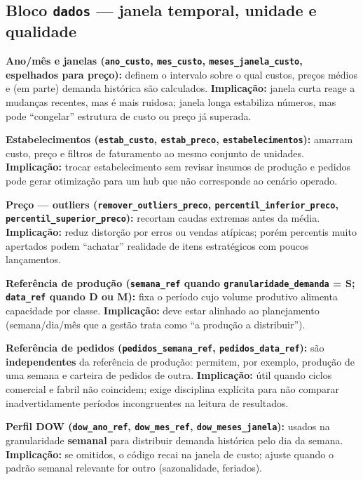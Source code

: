 \documentclass[11pt,a4paper]{article}
\begin{document}
\subsection{Bloco \texttt{dados} --- janela temporal, unidade e qualidade}

\textbf{Ano/mês e janelas (\texttt{ano\_custo}, \texttt{mes\_custo},
\texttt{meses\_janela\_custo}, espelhados para preço):} definem o intervalo
sobre o qual custos, preços médios e (em parte) demanda histórica são
calculados. \textbf{Implicação:} janela curta reage a mudanças recentes, mas é
mais ruidosa; janela longa estabiliza números, mas pode ``congelar'' estrutura
de custo ou preço já superada.

\textbf{Estabelecimentos (\texttt{estab\_custo}, \texttt{estab\_preco},
\texttt{estabelecimentos}):} amarram custo, preço e filtros de faturamento ao
mesmo conjunto de unidades. \textbf{Implicação:} trocar estabelecimento sem
revisar insumos de produção e pedidos pode gerar otimização para um hub que não
corresponde ao cenário operado.

\textbf{Preço --- outliers (\texttt{remover\_outliers\_preco},
\texttt{percentil\_inferior\_preco}, \texttt{percentil\_superior\_preco}):}
recortam caudas extremas antes da média. \textbf{Implicação:} reduz distorção
por erros ou vendas atípicas; porém percentis muito apertados podem ``achatar''
realidade de itens estratégicos com poucos lançamentos.

\textbf{Referência de produção (\texttt{semana\_ref} quando
\texttt{granularidade\_demanda} = S; \texttt{data\_ref} quando D ou M):} fixa o
período cujo volume produtivo alimenta capacidade por classe. \textbf{Implicação:}
deve estar alinhado ao planejamento (semana/dia/mês que a gestão trata como
``a produção a distribuir'').

\textbf{Referência de pedidos (\texttt{pedidos\_semana\_ref},
\texttt{pedidos\_data\_ref}):} são \textbf{independentes} da referência de
produção: permitem, por exemplo, produção de uma semana e carteira de pedidos
de outra. \textbf{Implicação:} útil quando ciclos comercial e fabril não
coincidem; exige disciplina explícita para não comparar inadvertidamente
períodos incongruentes na leitura de resultados.

\textbf{Perfil DOW (\texttt{dow\_ano\_ref}, \texttt{dow\_mes\_ref},
\texttt{dow\_meses\_janela}):} usados na granularidade \textbf{semanal} para
distribuir demanda histórica pelo dia da semana. \textbf{Implicação:} se
omitidos, o código recai na janela de custo; ajuste quando o padrão semanal
relevante for outro (sazonalidade, feriados).
\end{document}
